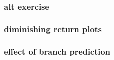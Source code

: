 
\subsubsection{alt exercise}


\subsubsection{diminishing return plots}


\subsubsection{effect of branch prediction}


